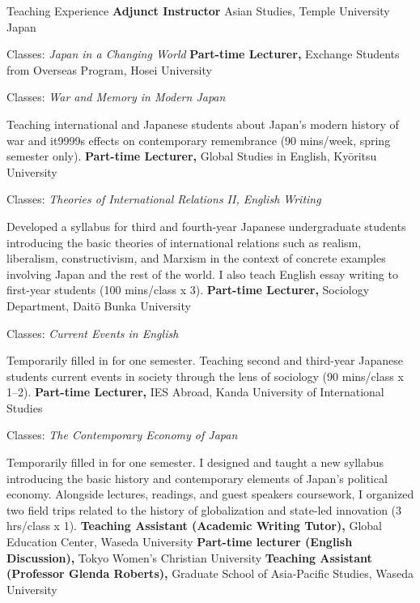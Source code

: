 \begin{rubric}{Teaching Experience}
\textbf{Adjunct Instructor} Asian Studies, Temple University Japan
\par Classes: \emph{Japan in a Changing World}
%
%
%
\textbf{Part-time Lecturer,} Exchange Students from Overseas Program, Hosei University
        \par Classes: \emph{War and Memory in Modern Japan}
        \par \small Teaching international and Japanese students about Japan's modern history of war and it9999s effects on contemporary remembrance (90 mins/week, spring semester only).
	\textbf{Part-time Lecturer,} Global Studies in English, Kyōritsu University
        \par Classes: \emph{Theories of International Relations II, English Writing}
        \par \small Developed a syllabus for third and fourth-year Japanese undergraduate students introducing the basic theories of international relations such as realism, liberalism, constructivism, and Marxism in the context of concrete examples involving Japan and the rest of the world. I also teach English essay writing to first-year students (100 mins/class x 3).
  \entry*[2024/09 -- 2025/03\hfill]%
	\textbf{Part-time Lecturer,} Sociology Department, Daitō Bunka University
        \par Classes: \emph{Current Events in English}
        \par \small Temporarily filled in for one semester. Teaching second and third-year Japanese students current events in society through the lens of sociology (90 mins/class x 1--2).
 \entry*[2024/09 -- 2024/12\hfill]%
	\textbf{Part-time Lecturer,} IES Abroad, Kanda University of International Studies
        \par Classes: \emph{The Contemporary Economy of Japan}
        \par \small Temporarily filled in for one semester. I designed and taught a new syllabus introducing the basic history and contemporary elements of Japan's political economy. Alongside lectures, readings, and guest speakers coursework, I organized two field trips related to the history of globalization and state-led innovation (3 hrs/class x 1).
\entry*[2019/09 -- 2025/02\hfill]%
	\textbf{Teaching Assistant (Academic Writing Tutor),} Global Education Center, Waseda University
%
%
%
 \entry*[2023/09 -- 2024/03\hfill]%
	\textbf{Part-time lecturer (English Discussion),} Tokyo Women's Christian University
\entry*[2023/04 -- 2024/03\hfill]%
	\textbf{Teaching Assistant (Professor Glenda Roberts),} Graduate School of Asia-Pacific Studies, Waseda University
\end{rubric}
